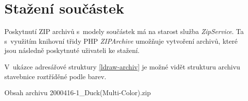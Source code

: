 \section{Stažení součástek}
Poskytnutí ZIP archivů s~modely součástek má na starost služba \textit{ZipService}. Ta s~využitím knihovní třidy PHP \textit{ZIPArchive} umožňuje vytvoření archivů, které jsou následně poskytnuté uživateli ke stažení. 

V~ukázce adresářové struktury \ref{ldraw-archiv} je možné vidět strukturu archivu stavebnice roztříděné podle barev.

\begin{dirfigure}%
    \caption{Obsah archivu 2000416-1\_Duck(Multi-Color).zip}\label{ldraw-archiv}
\end{dirfigure}